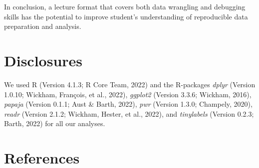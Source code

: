 \documentclass[
  man,floatsintext]{apa6}
\begin{document}
In conclusion, a lecture format that covers both data wrangling and debugging skills has the potential to improve student's understanding of reproducible data preparation and analysis.

\hypertarget{disclosures}{%
\section{Disclosures}\label{disclosures}}

We used R (Version 4.1.3; R Core Team, 2022) and the R-packages \emph{dplyr} (Version 1.0.10; Wickham, François, et al., 2022), \emph{ggplot2} (Version 3.3.6; Wickham, 2016), \emph{papaja} (Version 0.1.1; Aust \& Barth, 2022), \emph{pwr} (Version 1.3.0; Champely, 2020), \emph{readr} (Version 2.1.2; Wickham, Hester, et al., 2022), and \emph{tinylabels} (Version 0.2.3; Barth, 2022) for all our analyses.

\newpage

\hypertarget{references}{%
\section{References}\label{references}}
\end{document}
